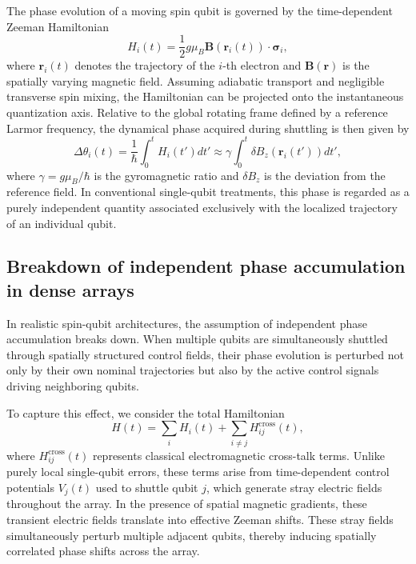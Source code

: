 \documentclass[a4paper,twocolumn,11pt]{quantumarticle}
\begin{document}
The phase evolution of a moving spin qubit is governed by the time-dependent Zeeman Hamiltonian
\begin{equation}
    H_i(t) = \frac{1}{2} g \mu_B \mathbf{B}(\mathbf{r}_i(t)) \cdot \boldsymbol{\sigma}_i,
\end{equation}
where $\mathbf{r}_i(t)$ denotes the trajectory of the $i$-th electron and $\mathbf{B}(\mathbf{r})$ is the spatially varying magnetic field. Assuming adiabatic transport and negligible transverse spin mixing, the Hamiltonian can be projected onto the instantaneous quantization axis. Relative to the global rotating frame defined by a reference Larmor frequency, the dynamical phase acquired during shuttling is then given by
\begin{equation}
    \Delta\theta_i(t) = \frac{1}{\hbar} \int_0^t H_i(t') dt' \approx \gamma \int_0^t \delta B_z(\mathbf{r}_i(t')) dt',
    \label{eq:dynamic_phase}
\end{equation}
where $\gamma = g \mu_B / \hbar$ is the gyromagnetic ratio and $\delta B_z$ is the deviation from the reference field. In conventional single-qubit treatments, this phase is regarded as a purely independent quantity associated exclusively with the localized trajectory of an individual qubit.

\subsection{Breakdown of independent phase accumulation in dense arrays}
\label{sec:breakdown}

In realistic spin-qubit architectures, the assumption of independent phase accumulation breaks down. When multiple qubits are simultaneously shuttled through spatially structured control fields, their phase evolution is perturbed not only by their own nominal trajectories but also by the active control signals driving neighboring qubits.

To capture this effect, we consider the total Hamiltonian
\begin{equation}
    H(t) = \sum_i H_i(t) + \sum_{i \neq j} H_{ij}^{\text{cross}}(t),
\end{equation}
where $H_{ij}^{\text{cross}}(t)$ represents classical electromagnetic cross-talk terms. Unlike purely local single-qubit errors, these terms arise from time-dependent control potentials $V_j(t)$ used to shuttle qubit $j$, which generate stray electric fields throughout the array. In the presence of spatial magnetic gradients, these transient electric fields translate into effective Zeeman shifts. These stray fields simultaneously perturb multiple adjacent qubits, thereby inducing spatially correlated phase shifts across the array. 
\end{document}
